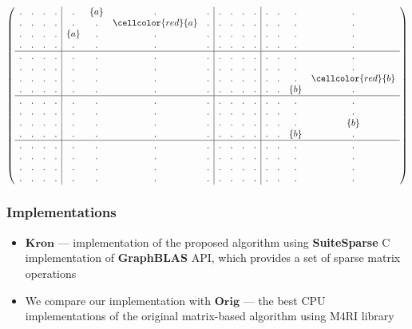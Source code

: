 \documentclass[xcolor=table]{beamer}
\begin{document}
\begin{frame}[fragile]
{    $$
    \left(
    \begin{array}{c c c c | c c c c | c c c c | c c c c }
    . & . & . & .  &  .     & \{a\} & .     & .  &  . & . & . & .  &  . & . & . & .   \\
    . & . & . & .  &  .     & .     & \cellcolor{red}\{a\} & .  &  . & . & . & .  &  . & . & . & .   \\
    . & . & . & .  &  \{a\} & .     & .     & .  &  . & . & . & .  &  . & . & . & .   \\
    . & . & . & .  &  .     & .     & .     & .  &  . & . & . & .  &  . & . & . & .   \\
    \hline
    . & . & . & .  &  . & . & . & .  &  . & . & . & .  &  . & . & . & .   \\
    . & . & . & .  &  . & . & . & .  &  . & . & . & .  &  . & . & . & .   \\
    . & . & . & .  &  . & . & . & .  &  . & . & . & .  &  . & . & . & \cellcolor{red} \{b\}   \\
    . & . & . & .  &  . & . & . & .  &  . & . & . & .  &  . & . & \{b\} & .   \\
    \hline
    . & . & . & .  &  . & . & . & .  &  . & . & . & .  &  . & . & . & .   \\
    . & . & . & .  &  . & . & . & .  &  . & . & . & .  &  . & . & . & .   \\
    . & . & . & .  &  . & . & . & .  &  . & . & . & .  &  . & . & . & \{b\}   \\
    . & . & . & .  &  . & . & . & .  &  . & . & . & .  &  . & . & \{b\} & . \\
    \hline
    . & . & . & .  &  . & . & . & .  &  . & . & . & .  &  . & . & . & .   \\
    . & . & . & .  &  . & . & . & .  &  . & . & . & .  &  . & . & . & .   \\
    . & . & . & .  &  . & . & . & .  &  . & . & . & .  &  . & . & . & .   \\
    . & . & . & .  &  . & . & . & .  &  . & . & . & .  &  . & . & . & .
    \end{array}
    \right)
	$$
}
\end{frame}

\begin{frame}[fragile] \frametitle{Implementations}

\begin{itemize}
	\item $\textbf{Kron}$ --- implementation of the proposed algorithm using \textbf{SuiteSparse} C implementation of \textbf{GraphBLAS} API, which provides a set of sparse matrix operations
	\pause
	\item We compare our implementation with $\textbf{Orig}$ --- the best CPU implementations of the original matrix-based algorithm using M4RI library
\end{itemize}
\end{frame}
\end{document}
